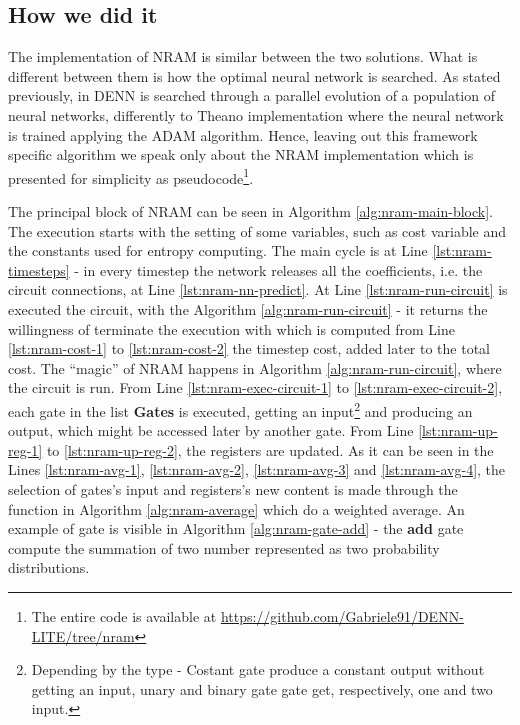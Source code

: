 \subsection{How we did it}
The implementation of NRAM is similar between the two solutions. What is different between them is how the optimal neural network is searched. As stated previously, in DENN is searched through a parallel evolution of a population of neural networks, differently to Theano implementation where the neural network is trained applying the ADAM algorithm. Hence, leaving out this framework specific algorithm we speak only about the NRAM implementation which is presented for simplicity as pseudocode\footnote{The entire code is available at \href{https://github.com/Gabriele91/DENN-LITE/tree/nram}{https://github.com/Gabriele91/DENN-LITE/tree/nram}}.

The principal block of NRAM can be seen in Algorithm \ref{alg:nram-main-block}. The execution starts with the setting of some variables, such as cost variable and the constants used for entropy computing. The main cycle is at Line \ref{lst:nram-timesteps} - in every timestep the network releases all the coefficients, i.e. the circuit connections, at Line \ref{lst:nram-nn-predict}. At Line \ref{lst:nram-run-circuit} is executed the circuit, with the Algorithm \ref{alg:nram-run-circuit} - it returns the willingness of terminate the execution with which is computed from Line \ref{lst:nram-cost-1} to \ref{lst:nram-cost-2} the timestep cost, added later to the total cost.
\newline\newline
The ``magic'' of NRAM happens in Algorithm \ref{alg:nram-run-circuit}, where the circuit is run. From Line \ref{lst:nram-exec-circuit-1} to \ref{lst:nram-exec-circuit-2}, each gate in the list \textbf{Gates} is executed, getting an input\footnote{Depending by the type - Costant gate produce a constant output without getting an input, unary and binary gate gate get, respectively, one and two input.} and producing an output, which might be accessed later by another gate. From Line \ref{lst:nram-up-reg-1} to \ref{lst:nram-up-reg-2}, the registers are updated.
\newline\newline
As it can be seen in the Lines \ref{lst:nram-avg-1}, \ref{lst:nram-avg-2}, \ref{lst:nram-avg-3} and \ref{lst:nram-avg-4}, the selection of gates's input and registers's new content is made through the function in Algorithm \ref{alg:nram-average} which do a weighted average. An example of gate is visible in Algorithm \ref{alg:nram-gate-add} - the \textbf{add} gate compute the summation of two number represented as two probability distributions.

